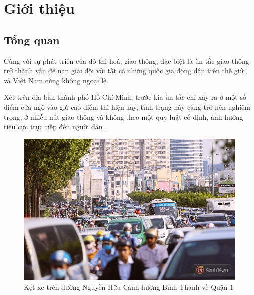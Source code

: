 
\chapter{Giới thiệu} %

\label{Chapter1} %


\newcommand{\keyword}[1]{\textbf{#1}}
\newcommand{\tabhead}[1]{\textbf{#1}}
\newcommand{\code}[1]{\texttt{#1}}
\newcommand{\file}[1]{\texttt{\bfseries#1}}
\newcommand{\option}[1]{\texttt{\itshape#1}}


\section{Tổng quan}
Cùng với sự phát triển của đô thị hoá, giao thông, đặc biệt là ùn tắc giao thông trở thành vấn đề nan giải đối với tất cả những quốc gia đông dân trên thế giới, và Việt Nam cũng không ngoại lệ.

Xét trên địa bàn thành phố Hồ Chí Minh, trước kia ùn tắc chỉ xảy ra ở một số điểm cửa ngõ vào giờ cao điểm thì hiện nay, tình trạng này càng trở nên nghiêm trọng, ở nhiều nút giao thông và không theo một quy luật cố định, ảnh hưởng tiêu cực trực tiếp đến người dân \cite{VOV}.

\begin{figure}[H]
\centering
\includegraphics[width=1.0\textwidth]{Traffic_Report/images/image01.jpg}
\caption{Kẹt xe trên đường Nguyễn Hữu Cảnh hướng Bình Thạnh về Quận 1}\label{}
\end{figure}

